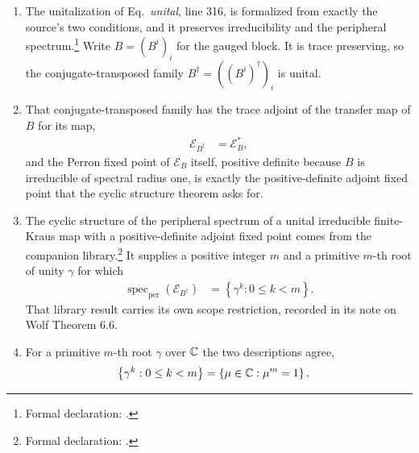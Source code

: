 \documentclass{article}
\begin{document}
\begin{enumerate}
    \item The unitalization of Eq.~\emph{unital}, line 316, is formalized from
          exactly the source's two conditions, and it preserves irreducibility
          and the peripheral spectrum.\footnote{Formal declaration:
          .}
          Write $B=(B^i)_i$ for the gauged block. It is trace preserving, so
          the conjugate-transposed family
          $B^\dagger=\left((B^i)^\dagger\right)_i$ is unital.
    \item That conjugate-transposed family has the trace adjoint of the
          transfer map of $B$ for its map,
          \begin{align}
              \mathcal E_{B^\dagger}
              &=\mathcal E_B^*,
              \label{eq:dccsp17_periodic_overlap_route_alignment_adjoint_orientation}
          \end{align}
          and the Perron fixed point of $\mathcal E_B$ itself, positive
          definite because $B$ is irreducible of spectral radius one, is
          exactly the positive-definite adjoint fixed point that the cyclic
          structure theorem asks for.
    \item The cyclic structure of the peripheral spectrum of a unital
          irreducible finite-Kraus map with a positive-definite adjoint fixed
          point comes from the companion library.\footnote{Formal declaration:
          .}
          It supplies a positive integer $m$ and a primitive $m$-th root of
          unity $\gamma$ for which
          \begin{align}
              \operatorname{spec}_{\mathrm{per}}(\mathcal E_{B^\dagger})
              &=\left\{\gamma^k:0\leq k<m\right\}.
              \label{eq:dccsp17_periodic_overlap_route_alignment_cyclic_peripheral_spectrum}
          \end{align}
          That library result carries its own scope restriction, recorded in
          its note on Wolf Theorem 6.6.
    \item For a primitive $m$-th root $\gamma$ over $\mathbb{C}$ the two descriptions
          agree,
          \begin{align}
              \left\{\gamma^k:0\leq k<m\right\}
              &=\left\{\mu\in\mathbb{C}:\mu^m=1\right\}.
              \label{eq:dccsp17_periodic_overlap_route_alignment_primitive_root_powers}
          \end{align}

\end{enumerate}
\end{document}

